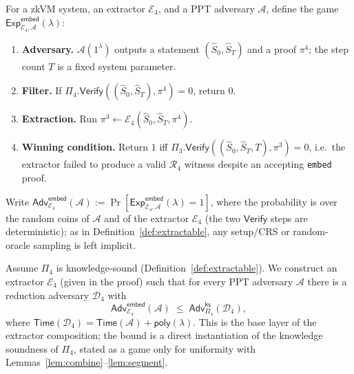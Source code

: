 \begin{definition}\label{game:embed}
For a zkVM system, an extractor $\mathcal{E}_4$, and a PPT adversary
$\mathcal{A}$, define the game
$\mathsf{Exp}^{\mathsf{embed}}_{\mathcal{E}_4,\mathcal{A}}(\lambda)$:
\begin{enumerate}
  \item \textbf{Adversary.} $\mathcal{A}(1^\lambda)$ outputs a statement
    $(\hat{S}_0,\hat{S}_T)$ and a proof $\pi^4$; the step count $T$ is a
    fixed system parameter.
  \item \textbf{Filter.} If
    $\Pi_4.\mathsf{Verify}((\hat{S}_0,\hat{S}_T),\pi^4)=0$, return $0$.
  \item \textbf{Extraction.} Run
    $\pi^3 \leftarrow \mathcal{E}_4(\hat{S}_0,\hat{S}_T,\pi^4)$.
  \item \textbf{Winning condition.} Return $1$ iff
    $\Pi_3.\mathsf{Verify}((\hat{S}_0,\hat{S}_T,T),\pi^3)=0$, i.e.\ the extractor
    failed to produce a valid $\mathcal{R}_4$ witness despite an accepting
    \texttt{embed} proof.
\end{enumerate}
Write $\mathsf{Adv}^{\mathsf{embed}}_{\mathcal{E}_4}(\mathcal{A}) :=
\Pr[\mathsf{Exp}^{\mathsf{embed}}_{\mathcal{E}_4,\mathcal{A}}(\lambda)=1]$,
where the probability is over the random coins of $\mathcal{A}$ and of the
extractor $\mathcal{E}_4$ (the two $\mathsf{Verify}$ steps are deterministic);
as in Definition~\ref{def:extractable}, any setup/CRS or random-oracle
sampling is left implicit.
\end{definition}


\begin{lemma}\label{lem:embed}
Assume $\Pi_4$ is knowledge-sound (Definition~\ref{def:extractable}).
We construct an extractor $\mathcal{E}_4$ (given in the proof) such that for every PPT
adversary $\mathcal{A}$ there is a reduction adversary $\mathcal{D}_4$ with
\[
  \mathsf{Adv}^{\mathsf{embed}}_{\mathcal{E}_4}(\mathcal{A})
  \;\le\; \mathsf{Adv}^{\mathsf{ks}}_{\Pi_4}(\mathcal{D}_4),
\]
where
$\mathsf{Time}(\mathcal{D}_4)=\mathsf{Time}(\mathcal{A})+\mathsf{poly}(\lambda)$.
This is the base layer of the extractor composition; the bound is a direct
instantiation of the knowledge soundness of $\Pi_4$, stated as a game only for
uniformity with Lemmas~\ref{lem:combine}--\ref{lem:segment}.
\end{lemma}

